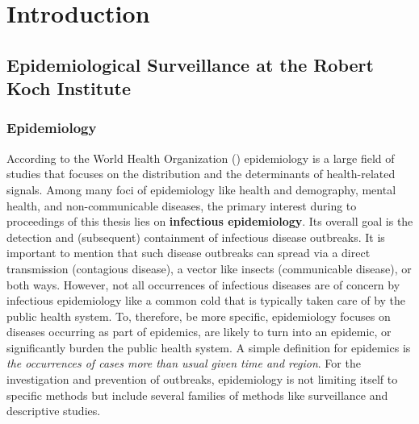 \chapter{Introduction}
%
%
%


\section{Epidemiological Surveillance at the Robert Koch Institute}

\subsection{Epidemiology}
According to the World Health Organization () epidemiology is a large field of studies that focuses on the distribution and the determinants of health-related signals\citep{WHOepi}.
Among many foci of epidemiology like health and demography, mental health, and non-communicable diseases, the primary interest during to proceedings of this thesis lies on \textbf{infectious epidemiology}.
Its overall goal is the detection and (subsequent) containment of infectious disease outbreaks.
It is important to mention that such disease outbreaks can spread via a direct transmission (contagious disease), a vector like insects (communicable disease), or both ways.
However, not all occurrences of infectious diseases are of concern by infectious epidemiology like a common cold that is typically taken care of by the public health system.
To, therefore, be more specific, epidemiology focuses on diseases occurring as part of epidemics, are likely to turn into an epidemic, or significantly burden the public health system.
A simple definition for epidemics is \textsl{the occurrences of cases more than usual given time and region}.
For the investigation and prevention of outbreaks, epidemiology is not limiting itself to specific methods but include several families of methods like surveillance and descriptive studies.


